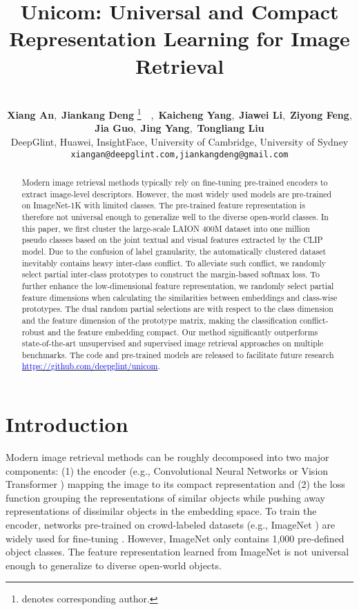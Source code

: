 \documentclass{article} \usepackage{iclr2023_conference,times}
\title{Unicom: Universal and Compact \\ Representation Learning for Image Retrieval}
\author{\\{\bf Xiang An},~{\bf Jiankang Deng} \thanks{denotes corresponding author.}~~,~{\bf Kaicheng Yang},~{\bf Jiawei Li},~{\bf Ziyong Feng},\\{\bf Jia Guo},~{\bf Jing Yang},~{\bf Tongliang Liu}  \\
DeepGlint, Huawei, InsightFace, University of Cambridge, University of Sydney\\
\texttt{xiangan@deepglint.com,jiankangdeng@gmail.com} \\}
\def\laion{LAION 400M dataset}
\begin{document}
\maketitle

\begin{abstract}
Modern image retrieval methods typically rely on fine-tuning pre-trained encoders to extract image-level descriptors.
However, the most widely used models are pre-trained on ImageNet-1K with limited classes. The pre-trained feature representation is therefore not universal enough to generalize well to the diverse open-world classes. 
In this paper, we first cluster the large-scale \laion{} into one million pseudo classes based on the joint textual and visual features extracted by the CLIP model. Due to the confusion of label granularity, the automatically clustered dataset inevitably contains heavy inter-class conflict. To alleviate such conflict, we randomly select partial inter-class prototypes to construct the margin-based softmax loss. To further enhance the low-dimensional feature representation, we randomly select partial feature dimensions when calculating the similarities between embeddings and class-wise prototypes. The dual random partial selections are with respect to the class dimension and the feature dimension of the prototype matrix, making the classification conflict-robust and the feature embedding compact. Our method significantly outperforms state-of-the-art unsupervised and supervised image retrieval approaches on multiple benchmarks. The code and pre-trained models are released to facilitate future research \href{https://github.com/deepglint/unicom}{\textcolor{blue}{https://github.com/deepglint/unicom}}. 

\end{abstract}

\section{Introduction}
Modern image retrieval methods \citep{Lim2022CVPR,Roth2022CVPR,Kim2022CVPR,Ermolov_2022_CVPR,Patel2022CVPR} can be roughly decomposed into two major components: (1) the encoder (e.g., Convolutional
Neural Networks \citep{szegedy2015going,he2016deep} or Vision Transformer \citep{touvron2021training,dosovitskiy2021image}) mapping the image to its compact representation and (2) the loss function \citep{musgrave2020metric} grouping the representations of similar objects while pushing away representations of dissimilar objects in the embedding space.  
To train the encoder, networks pre-trained on crowd-labeled datasets (e.g., ImageNet \citep{deng2009imagenet}) are widely used for fine-tuning \citep{wang2019multi,kim2021embedding}. However, ImageNet only contains 1,000 pre-defined object classes. The feature representation learned from ImageNet is not universal enough to generalize to diverse open-world objects.
\end{document}
